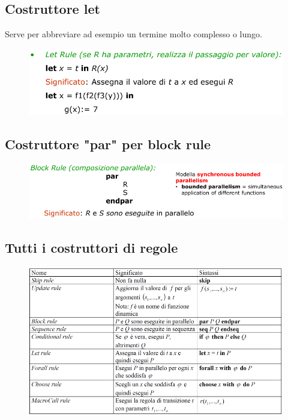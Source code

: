 \subsection{Costruttore let}
Serve per abbreviare ad esempio un termine molto complesso o lungo. 

\begin{figure}[H]
    \includegraphics[width=0.8\linewidth]{chapters/1-asm/images/let.png}
\end{figure}

\subsection{Costruttore "par" per block rule}

\begin{figure}[H]
    \includegraphics[width=0.8\linewidth]{chapters/1-asm/images/par.png}
\end{figure}

\subsection{Tutti i costruttori di regole}

\begin{figure}[H]
    \centering
    \includegraphics[width=1\linewidth]{chapters/1-asm/images/costruttori.png}
\end{figure}


